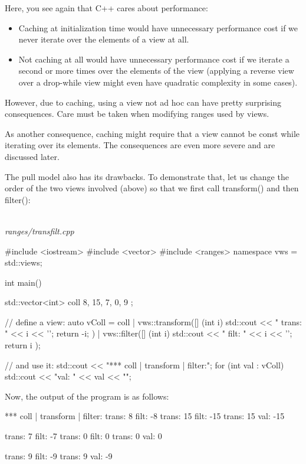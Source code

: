 Here, you see again that C++ cares about performance:

\begin{itemize}
\item
Caching at initialization time would have unnecessary performance cost if we never iterate over the elements of a view at all.

\item
Not caching at all would have unnecessary performance cost if we iterate a second or more times over the elements of the view (applying a reverse view over a drop-while view might even have quadratic complexity in some cases).
\end{itemize}

However, due to caching, using a view not ad hoc can have pretty surprising consequences. Care must be taken when modifying ranges used by views.

As another consequence, caching might require that a view cannot be const while iterating over its elements. The consequences are even more severe and are discussed later.


The pull model also has its drawbacks. To demonstrate that, let us change the order of the two views involved (above) so that we first call transform() and then filter():

\noindent
\hspace*{\fill} \\ %
\textit{ranges/transfilt.cpp}

\begin{cpp}
#include <iostream>
#include <vector>
#include <ranges>
namespace vws = std::views;

int main()
{
	std::vector<int> coll{ 8, 15, 7, 0, 9 };
	
	// define a view:
	auto vColl = coll
	| vws::transform([] (int i) {
		std::cout << " trans: " << i << '\n';
		return -i;
	})
	| vws::filter([] (int i) {
		std::cout << " filt: " << i << '\n';
		return i %
	});
	
	// and use it:
	std::cout << "*** coll | transform | filter:\n";
	for (int val : vColl) {
	std::cout << "val: " << val << "\n\n";
	}
}
\end{cpp}

Now, the output of the program is as follows:

{\footnotesize
\begin{shell}
*** coll | transform | filter:
trans: 8
filt: -8
trans: 15
filt: -15
trans: 15
val: -15

trans: 7
filt: -7
trans: 0
filt: 0
trans: 0
val: 0

trans: 9
filt: -9
trans: 9
val: -9
\end{shell}
}

